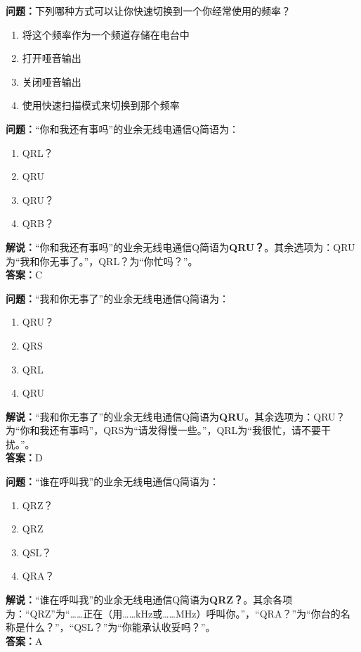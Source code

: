 \bigskip


\noindent\textbf{问题：}下列哪种方式可以让你快速切换到一个你经常使用的频率？
\begin{enumerate}[label=\Alph*), leftmargin=3em]
\item 将这个频率作为一个频道存储在电台中
\item 打开哑音输出
\item 关闭哑音输出
\item 使用快速扫描模式来切换到那个频率
\end{enumerate}

\bigskip


\noindent\textbf{问题：}“你和我还有事吗”的业余无线电通信Q简语为：
\begin{enumerate}[label=\Alph*), leftmargin=3em]
\item QRL？
\item QRU
\item QRU？
\item QRB？
\end{enumerate}
\noindent\textbf{解说：}“你和我还有事吗”的业余无线电通信Q简语为\textbf{QRU？}。其余选项为：QRU为“我和你无事了。”，QRL？为“你忙吗？”。\\\noindent\textbf{答案：}C


\bigskip


\noindent\textbf{问题：}“我和你无事了”的业余无线电通信Q简语为：
\begin{enumerate}[label=\Alph*), leftmargin=3em]
\item QRU？
\item QRS
\item QRL
\item QRU
\end{enumerate}
\noindent\textbf{解说：}“我和你无事了”的业余无线电通信Q简语为\textbf{QRU}。其余选项为：QRU？为“你和我还有事吗”，QRS为“请发得慢一些。”，QRL为“我很忙，请不要干扰。”。\\\noindent\textbf{答案：}D



\bigskip


\noindent\textbf{问题：}“谁在呼叫我”的业余无线电通信Q简语为：
\begin{enumerate}[label=\Alph*), leftmargin=3em]
\item QRZ？
\item QRZ
\item QSL？
\item QRA？
\end{enumerate}
\noindent\textbf{解说：}“谁在呼叫我”的业余无线电通信Q简语为\textbf{QRZ？}。其余各项为：“QRZ”为“……正在（用……kHz或……MHz）呼叫你。”，“QRA？”为“你台的名称是什么？”，“QSL？”为“你能承认收妥吗？”。\\\noindent\textbf{答案：}A

